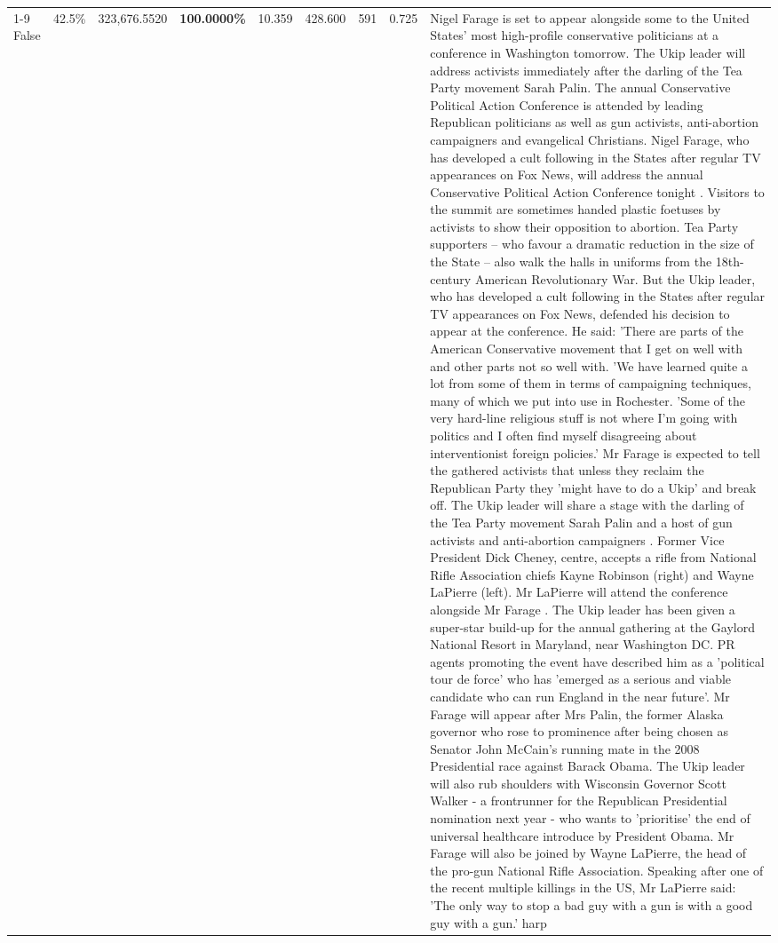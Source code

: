 \begin{table}[H]
\begin{tabular}{lllrlllll}
\cline{1-9}
False & 42.5\% & 323,676.5520 & \bfseries \color{red} 100.0000\% & 10.359 & 428.600 & 591 & 0.725 & Nigel Farage is set to appear alongside some to the United States' most high-profile conservative politicians at a conference in Washington tomorrow. The Ukip leader will address activists immediately after the darling of the Tea Party movement Sarah Palin. The annual Conservative Political Action Conference is attended by leading Republican politicians as well as gun activists, anti-abortion campaigners and evangelical Christians. Nigel Farage, who has developed a cult following in the States after regular TV appearances on Fox News, will address the annual Conservative Political Action Conference tonight . Visitors to the summit are sometimes handed plastic foetuses by activists to show their opposition to abortion. Tea Party supporters – who favour a dramatic reduction in the size of the State – also walk the halls in uniforms from the 18th-century American Revolutionary War. But the Ukip leader, who has developed a cult following in the States after regular TV appearances on Fox News, defended his decision to appear at the conference. He said: 'There are parts of the American Conservative movement that I get on well with and other parts not so well with. 'We have learned quite a lot from some of them in terms of campaigning techniques, many of which we put into use in Rochester. 'Some of the very hard-line religious stuff is not where I'm going with politics and I often find myself disagreeing about interventionist foreign policies.' Mr Farage is expected to tell the gathered activists that unless they reclaim the Republican Party they 'might have to do a Ukip' and break off. The Ukip leader will share a stage with the darling of the Tea Party movement Sarah Palin and a host of gun activists and anti-abortion campaigners . Former Vice President Dick Cheney, centre, accepts a rifle from National Rifle Association chiefs Kayne Robinson (right) and Wayne LaPierre (left). Mr LaPierre will attend the conference alongside Mr Farage . The Ukip leader has been given a super-star build-up for the annual gathering at the Gaylord National Resort in Maryland, near Washington DC. PR agents promoting the event have described him as a 'political tour de force' who has 'emerged as a serious and viable candidate who can run England in the near future'. Mr Farage will appear after Mrs Palin, the former Alaska governor who rose to prominence after being chosen as Senator John McCain's running mate in the 2008 Presidential race against Barack Obama. The Ukip leader will also rub shoulders with Wisconsin Governor Scott Walker - a frontrunner for the Republican Presidential nomination next year - who wants to 'prioritise' the end of universal healthcare introduce by President Obama. Mr Farage will also be joined by Wayne LaPierre, the head of the pro-gun National Rifle Association. Speaking after one of the recent multiple killings in the US, Mr LaPierre said: 'The only way to stop a bad guy with a gun is with a good guy with a gun.' harp \\

\end{tabular}
\end{table}
